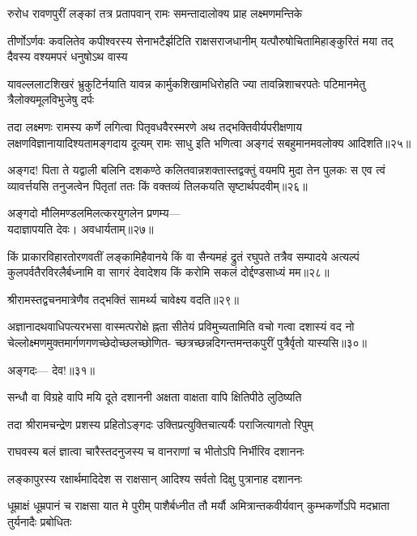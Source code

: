 \twolineshloka
{रुरोध रावणपुरीं लङ्कां तत्र प्रतापवान्}
{रामः समन्तादालोक्य प्राह लक्ष्मणमन्तिके} %

\fourlineindentedshloka
{तीर्णोऽर्णवः कवलितेव कपीश्वरस्य}
{सेनाभटैर्झटिति राक्षसराजधानीम्}
{यत्पौरुषोचितामिहाङ्कुरितं मया तद्}
{दैवस्य वश्यमपरं धनुषोऽथ वास्य} %


\fourlineindentedshloka
{यावल्ललाटशिखरं भ्रुकुटिर्नयाति}
{यावन्न कार्मुकशिखामधिरोहति ज्या}
{तावन्निशाचरपतेः पटिमानमेतु}
{त्रैलोक्यमूलविभुजेषु दर्पः} %


तदा लक्ष्मणः रामस्य कर्णे लगित्वा पितृवधवैरस्मरणे अथ 
तद्भक्तिवीर्यपरीक्षणाय लक्षणविज्ञानायादिश्यतामङ्गदाय दूत्यम्
रामः साधु इति भणित्वा अङ्गदं सबहुमानमवलोक्य आदिशति॥२५॥

अङ्गद! पिता ते यद्वाली बलिनि दशकण्ठे
कलितवान्नशक्तास्तद्वक्तुं वयमपि मुदा तेन पुलकः
स एव त्वं व्यावर्त्तयसि तनुजत्वेन पितृतां 
ततः किं वक्तव्यं तिलकयति सृष्टार्थपदवीम्॥२६॥

अङ्गदो मौलिमण्डलमिलत्करयुगलेन प्रणम्य---\\
यदाज्ञापयति देवः। अवधार्यताम्॥२७॥

किं प्राकारविहारतोरणवतीं लङ्कामिहैवानये
किं वा सैन्यमहं द्रुतं रघुपते तत्रैव सम्पादये
अत्यल्पं कुलपर्वतैरविरलैर्बध्नामि वा सागरं
देवादेशय किं करोमि सकलं दोर्द्दण्डसाध्यं मम॥२८॥

श्रीरामस्तद्वचनमात्रेणैव तद्भक्तिं सामर्थ्य चावेक्ष्य वदति॥२९॥

अज्ञानादथवाधिपत्यरभसा वास्मत्परोक्षे ह्नता सीतेयं
प्रविमुच्यतामिति वचो गत्वा दशास्यं वद
नो चेल्लोक्ष्मणमुक्तमार्गणगणच्छेदोच्छलच्छोणित-
च्छत्रच्छन्नदिगन्तमन्तकपुरीं पुत्रैर्वृतो यास्यसि॥३०॥

अङ्गदः--- देव!॥३१॥

\addtocounter{shlokacount}{7}
\twolineshloka
{सन्धौ वा विग्रहे वापि मयि दूते दशाननी}
{अक्षता वाक्षता वापि क्षितिपीठे लुठिष्यति} %

\twolineshloka
{तदा श्रीरामचन्द्रेण प्रशस्य प्रहितोऽङ्गदः}
{उक्तिप्रत्युक्तिचात्यर्यैः पराजित्यागतो रिपुम्} %

\twolineshloka
{राघवस्य बलं ज्ञात्वा चारैस्तदनुजस्य च}
{वानराणां च भीतोऽपि निर्भीरिव दशाननः} %

\twolineshloka
{लङ्कापुरस्य रक्षार्थमादिदेश स राक्षसान्}
{आदिश्य सर्वतो दिक्षु पुत्रानाह दशाननः} %

\threelineshloka
{धूम्राक्षं धूम्रपानं च राक्षसा यात मे पुरीम्}
{पाशैर्बध्नीत तौ मर्यौ अमित्रान्तकवीर्यवान्}
{कुम्भकर्णोऽपि मदभ्राता तुर्यनादैः प्रबोधितः} %

